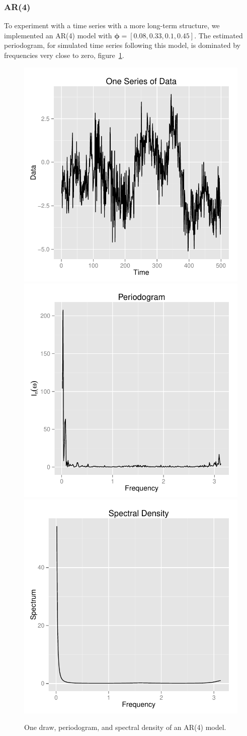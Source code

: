 \documentclass{article}\usepackage{graphicx, color}
\newenvironment{knitrout}{}{} %
\theoremstyle{plain}
\begin{document}
\subsubsection{AR(4)}
To experiment with a time series with a more long-term structure, we implemented an AR(4) model with $\boldsymbol{\phi} = [0.08, 0.33, 0.1, 0.45]$. The estimated periodogram, for simulated time series following this model, is dominated by frequencies very close to zero, figure~\ref{fig:inital-ar4}. 
\begin{knitrout}
\color{fgcolor}\begin{figure}[h]

\includegraphics[width=.33\textwidth]{figure/inital-ar41} 
\includegraphics[width=.33\textwidth]{figure/inital-ar42} 
\includegraphics[width=.33\textwidth]{figure/inital-ar43} \caption[One draw, periodogram, and spectral density of an AR(4) model]{One draw, periodogram, and spectral density of an AR(4) model.\label{fig:inital-ar4}}
\end{figure}


\end{knitrout}
\end{document}
